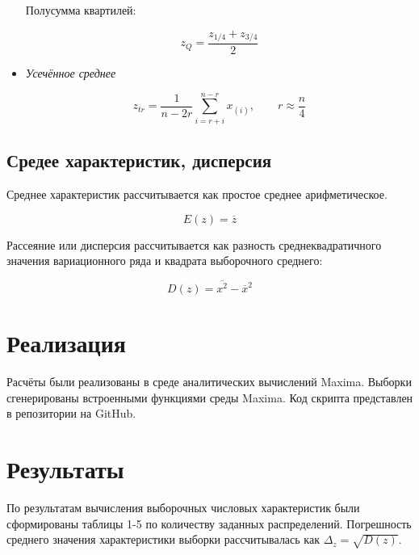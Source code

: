 \documentclass[12pt]{article}
\begin{document}
\begin{flushleft}
\begin{itemize}
				Полусумма квартилей:

				\begin{equation}
					z_Q = \frac{z_{1/4} + z_{3/4}}{2}
					\label{quart}
				\end{equation}

				\item \textit{Усечённое среднее}
				
				\begin{equation}
					z_{tr} = \frac{1}{n - 2r} \sum_{i=r+i}^{n - r}x_{(i)}, \qquad r \approx \frac{n}{4}  
					\label{trunc}
				\end{equation}

			\end{itemize}

	\subsection{Средее характеристик, дисперсия}
		
		Среднее характеристик рассчитывается как простое среднее арифметическое.

		\begin{equation}
			E(z) = \overline{z}
			\label{E}
		\end{equation}

		Рассеяние или дисперсия рассчитывается как разность среднеквадратичного значения вариационного ряда и квадрата выборочного среднего:

		\begin{equation}
			D(z) = \overline{x^2} - {\overline{x}}^2
			\label{D}
		\end{equation}
		
\newpage

\section{Реализация}

Расчёты были реализованы в среде аналитических вычислений Maxima. Выборки сгенерированы встроенными функциями среды Maxima. Код скрипта представлен в репозитории на GitHub.

\newpage

\section{Результаты}

По результатам вычисления выборочных числовых характеристик были сформированы таблицы 1-5 по количеству заданных распределений. Погрешность среднего значения характеристики выборки рассчитывалась как $\Delta_z = \sqrt{D(z)}$.


\end{flushleft}
\end{document}
